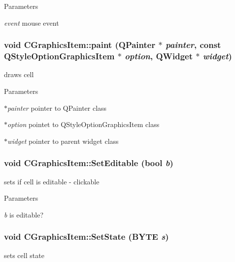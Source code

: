 \begin{DoxyParams}{Parameters}
\item[{\em event}]mouse event \end{DoxyParams}
\hypertarget{classCGraphicsItem_ad417dbdb6e271454a8e18cddde6867ea}{
\subsubsection[{paint}]{\setlength{\rightskip}{0pt plus 5cm}void CGraphicsItem::paint (QPainter $\ast$ {\em painter}, \/  const QStyleOptionGraphicsItem $\ast$ {\em option}, \/  QWidget $\ast$ {\em widget})}}
\label{classCGraphicsItem_ad417dbdb6e271454a8e18cddde6867ea}
draws cell


\begin{DoxyParams}{Parameters}
\item[{\em $\ast$painter}]pointer to QPainter class \item[{\em $\ast$option}]pointet to QStyleOptionGraphicsItem class \item[{\em $\ast$widget}]pointer to parent widget class \end{DoxyParams}
\hypertarget{classCGraphicsItem_a58c3123bfe6213f33e9fcb0f39984be4}{
\subsubsection[{SetEditable}]{\setlength{\rightskip}{0pt plus 5cm}void CGraphicsItem::SetEditable (bool {\em b})}}
\label{classCGraphicsItem_a58c3123bfe6213f33e9fcb0f39984be4}
sets if cell is editable -\/ clickable


\begin{DoxyParams}{Parameters}
\item[{\em b}]is editable? \end{DoxyParams}
\hypertarget{classCGraphicsItem_a356ca18291bc9ef8ae5e764c9d8bfb1a}{
\subsubsection[{SetState}]{\setlength{\rightskip}{0pt plus 5cm}void CGraphicsItem::SetState (BYTE {\em s})}}
\label{classCGraphicsItem_a356ca18291bc9ef8ae5e764c9d8bfb1a}
sets cell state


